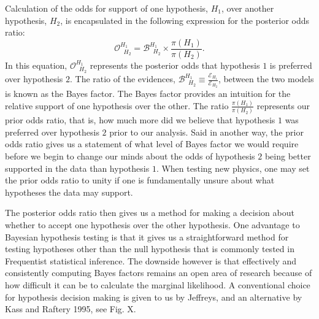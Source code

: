 Calculation of the odds for support of one hypothesis, $H_1$, over another hypothesis, $H_2$, is encapsulated in the following expression for the posterior odds ratio:
\begin{equation}\label{eqn:odds_ratio}
\mathcal{O}^{H_1\;\;}_{\;\;H_2} = \mathcal{B}^{H_1\;\;}_{\;\;H_2} \times \frac{\pi(H_1)}{\pi(H_2)}.
\end{equation}
In this equation, $\mathcal{O}^{H_1\;\;}_{\;\;H_2}$ represents the posterior odds that hypothesis $1$ is preferred over hypothesis $2$. The ratio of the evidences, $\mathcal{B}^{H_1\;\;}_{\;\;H_2} \equiv \frac{\mathcal{E}_{H_1}}{\mathcal{E}_{H_2}}$, between the two models is known as the Bayes factor. The Bayes factor provides an intuition for the relative support of one hypothesis over the other. The ratio $\frac{\pi(H_1)}{\pi(H_2)}$ represents our prior odds ratio, that is, how much more did we believe that hypothesis $1$ was preferred over hypothesis $2$ prior to our analysis. Said in another way, the prior odds ratio gives us a statement of what level of Bayes factor we would require before we begin to change our minds about the odds of hypothesis $2$ being better supported in the data than hypothesis $1$. When testing new physics, one may set the prior odds ratio to unity if one is fundamentally unsure about what hypotheses the data may support.

The posterior odds ratio then gives us a method for making a decision about whether to accept one hypothesis over the other hypothesis. One advantage to Bayesian hypothesis testing is that it gives us a straightforward method for testing hypotheses other than the null hypothesis that is commonly tested in Frequentist statistical inference. The downside however is that effectively and consistently computing Bayes factors remains an open area of research because of how difficult it can be to calculate the marginal likelihood. A conventional choice for hypothesis decision making is given to us by Jeffreys, and an alternative by Kass and Raftery 1995, see Fig. X.

